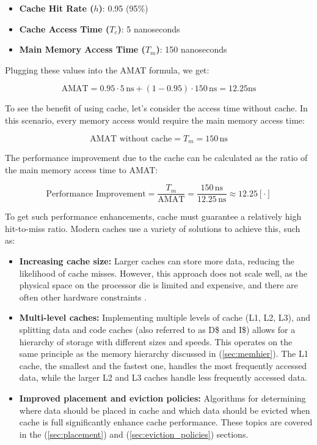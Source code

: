 \begin{itemize}
    \item \textbf{Cache Hit Rate ($h$)}: 0.95 (95\%) \cite{comparchaquant}
    \item \textbf{Cache Access Time ($T_c$)}: 5 nanoseconds \cite{Patterson2013}
    \item \textbf{Main Memory Access Time ($T_m$)}: 150 nanoseconds \cite{Hamacher2011}
\end{itemize}

\noindent Plugging these values into the AMAT formula, we get:

\[
\text{AMAT} = 0.95 \cdot 5 \, \text{ns} + (1 - 0.95) \cdot 150 \, \text{ns} = 12.25 \text{ns}
\]

\noindent To see the benefit of using cache, let's consider the access time without cache. In this scenario, every memory access would require the main memory access time:

\[
\text{AMAT without cache} = T_m = 150 \, \text{ns}
\]

\noindent The performance improvement due to the cache can be calculated as the ratio of the main memory access time to AMAT:

\[
\text{Performance Improvement} = \frac{T_m}{\text{AMAT}} = \frac{150 \, \text{ns}}{12.25 \, \text{ns}} \approx 12.25 [\cdot]
\]

\vspace{10px} \noindent To get such performance enhancements, cache must guarantee a relatively high hit-to-miss ratio. Modern caches use a variety of solutions to achieve this, such as:

\begin{itemize}
	\item \textbf{Increasing cache size:} Larger caches can store more data, reducing the likelihood of cache misses. However, this approach does not scale well,
		as the physical space on the processor die is limited and expensive, and there are often other hardware constraints \cite{Smith1982, Hill1989}.
	\item \textbf{Multi-level caches:} Implementing multiple levels of cache (L1, L2, L3), and splitting data and code caches (also referred to as D\$ and I\$) allows for a hierarchy of storage with different
		sizes and speeds. This operates on the same principle as the memory hierarchy discussed in (\ref{sec:memhier}). The L1 cache, the smallest and the fastest one, handles the most frequently accessed data,
		while the larger L2 and L3 caches handle less frequently accessed data.
	\item \textbf{Improved placement and eviction policies:} Algorithms for determining where data should be placed in cache and which data should be evicted when cache is full
		significantly enhance cache performance. These topics are covered in the (\ref{sec:placement}) and (\ref{sec:eviction_policies}) sections.
\end{itemize}

